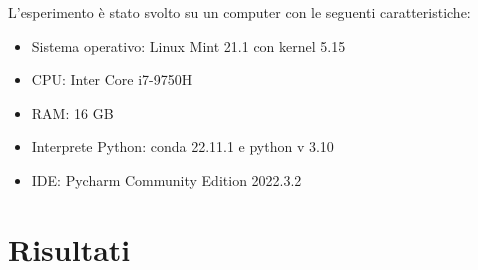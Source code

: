 \documentclass[
]{article}
\begin{document}
L'esperimento è stato svolto su un computer con le seguenti
caratteristiche:

\begin{itemize}
\item
  Sistema operativo: Linux Mint 21.1 con kernel 5.15
\item
  CPU: Inter Core i7-9750H
\item
  RAM: 16 GB
\item
  Interprete Python: conda 22.11.1 e python v 3.10
\item
  IDE: Pycharm Community Edition 2022.3.2
\end{itemize}

\hypertarget{risultati}{%
\section{Risultati}\label{risultati}}
\end{document}

